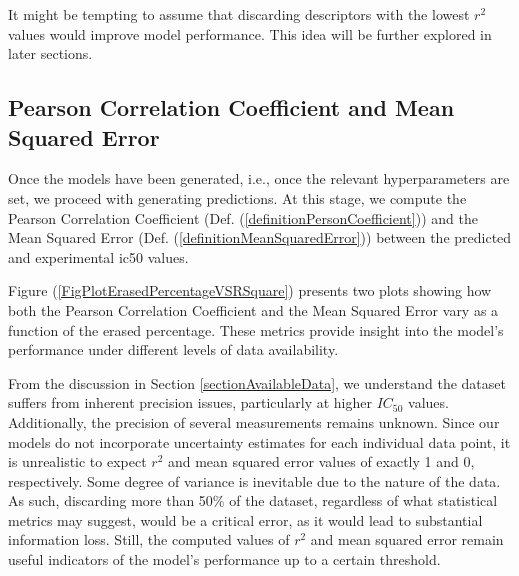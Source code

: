 \documentclass[11pt]{article}
\begin{document}
It might be tempting to assume that discarding descriptors with the lowest $r^2$ values would improve model performance. This idea will be further explored in later sections.

\subsection{Pearson Correlation Coefficient and Mean Squared Error}\label{sectionPersonCorrelationFactor}

Once the models have been generated, i.e., once the relevant hyperparameters are set, we proceed with generating predictions. At this stage, we compute the Pearson Correlation Coefficient (Def. (\ref{definitionPersonCoefficient})) and the Mean Squared Error (Def. (\ref{definitionMeanSquaredError})) between the predicted and experimental \gls{ic50} values.

Figure (\ref{FigPlotErasedPercentageVSRSquare}) presents two plots showing how both the Pearson Correlation Coefficient and the Mean Squared Error vary as a function of the erased percentage. These metrics provide insight into the model’s performance under different levels of data availability.

From the discussion in Section \ref{sectionAvailableData}, we understand the dataset suffers from inherent precision issues, particularly at higher $IC_{50}$ values. Additionally, the precision of several measurements remains unknown. Since our models do not incorporate uncertainty estimates for each individual data point, it is unrealistic to expect $r^2$ and mean squared error values of exactly 1 and 0, respectively. Some degree of variance is inevitable due to the nature of the data. As such, discarding more than 50\% of the dataset, regardless of what statistical metrics may suggest, would be a critical error, as it would lead to substantial information loss. Still, the computed values of $r^2$ and mean squared error remain useful indicators of the model's performance up to a certain threshold.
\end{document}
